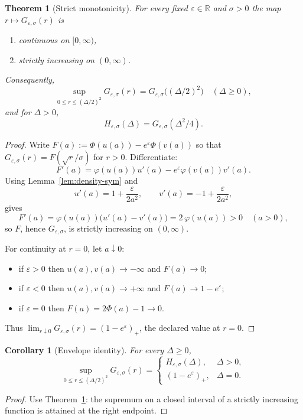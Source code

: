 \documentclass[11pt]{article}
\newcommand{\R}{\mathbb{R}}
\newcommand{\PhiStd}{\Phi}
\newtheorem{theorem}{Theorem}
\newtheorem{corollary}{Corollary}
\begin{document}
\begin{theorem}[Strict monotonicity]\label{thm:mono}
For every fixed $\varepsilon\in\R$ and $\sigma>0$ the map
$r\mapsto G_{\varepsilon,\sigma}(r)$ is
\begin{enumerate}
\item continuous on $[0,\infty)$,
\item strictly increasing on $(0,\infty)$.
\end{enumerate}
Consequently,
\[
\sup_{0\le r\le (\Delta/2)^2}G_{\varepsilon,\sigma}(r)
=
G_{\varepsilon,\sigma}\!\bigl((\Delta/2)^2\bigr)
\quad (\Delta\ge 0),
\]
and for $\Delta>0$,
\[
H_{\varepsilon,\sigma}(\Delta)=G_{\varepsilon,\sigma}(\Delta^2/4).
\]
\end{theorem}

\begin{proof}
Write $F(a):=\PhiStd(u(a))-e^\varepsilon\PhiStd(v(a))$ so that
$G_{\varepsilon,\sigma}(r)=F(\sqrt r/\sigma)$ for $r>0$.
Differentiate:
\[
F'(a)=\varphi(u(a))u'(a)-e^\varepsilon\varphi(v(a))v'(a).
\]
Using Lemma~\ref{lem:density-sym} and
\[
u'(a)=1+\frac{\varepsilon}{2a^2},
\qquad
v'(a)=-1+\frac{\varepsilon}{2a^2},
\]
gives
\[
F'(a)=\varphi(u(a))\bigl(u'(a)-v'(a)\bigr)
=2\,\varphi(u(a))>0
\quad(a>0),
\]
so $F$, hence $G_{\varepsilon,\sigma}$, is strictly increasing on $(0,\infty)$.

For continuity at $r=0$, let $a\downarrow0$:
\begin{itemize}
\item if $\varepsilon>0$ then $u(a),v(a)\to-\infty$ and $F(a)\to0$;
\item if $\varepsilon<0$ then $u(a),v(a)\to+\infty$ and $F(a)\to 1-e^\varepsilon$;
\item if $\varepsilon=0$ then $F(a)=2\PhiStd(a)-1\to0$.
\end{itemize}
Thus $\lim_{r\downarrow0}G_{\varepsilon,\sigma}(r)=(1-e^\varepsilon)_+$,
the declared value at $r=0$.
\end{proof}

\begin{corollary}[Envelope identity]\label{cor:envelope}
For every $\Delta\ge0$,
\[
\sup_{0\le r\le (\Delta/2)^2} G_{\varepsilon,\sigma}(r)
=
\begin{cases}
H_{\varepsilon,\sigma}(\Delta), & \Delta>0,\\[6pt]
(1-e^\varepsilon)_+, & \Delta=0.
\end{cases}
\]
\end{corollary}

\begin{proof}
Use Theorem~\ref{thm:mono}: the supremum on a closed interval of a strictly
increasing function is attained at the right endpoint.
\end{proof}
\end{document}

